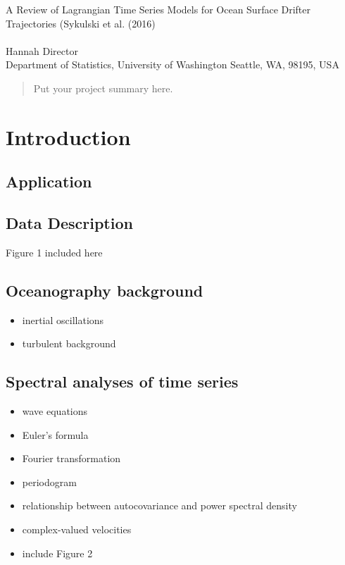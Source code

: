 \documentclass{stat572Style}
\begin{document}

\begin{center}
  {\LARGE A Review of Lagrangian Time Series Models for Ocean Surface Drifter Trajectories (Sykulski et al. (2016)}\\\ \\
  {Hannah Director \\ 
    Department of Statistics, University of Washington Seattle, WA, 98195, USA
  }
\end{center}



\begin{abstract}
  Put your project summary here.
\end{abstract}

\section{Introduction}
	\subsection{Application}
		\subsection{Data Description}
			Figure 1 included here 
		\subsection{Oceanography background}
			\begin{itemize}
				\item inertial oscillations
				\item turbulent background
			\end{itemize}
			

	\subsection{Spectral analyses of time series}
			\begin{itemize}
				\item  wave equations
				\item Euler's formula
				\item Fourier transformation
				\item periodogram
				\item relationship between autocovariance and power spectral density
				\item complex-valued velocities
				\item include Figure 2
			\end{itemize}
\end{document}
